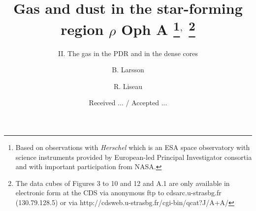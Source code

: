 \documentclass{aa}
\begin{document}
\title{Gas and dust in the star-forming region $\rho$ Oph A
\thanks{Based on observations with {\it Herschel} which is an ESA space observatory with science instruments provided by European-led Principal Investigator consortia and with important participation from NASA.}$^{,}$
\thanks{The data cubes of Figures 3 to 10 and 12 and A.1 are only available in electronic form at the CDS via anonymous ftp to cdsarc.u-strasbg.fr (130.79.128.5) or via http://cdsweb.u-strasbg.fr/cgi-bin/qcat?J/A+A/}
}

\subtitle{II. The gas in the PDR and in the dense cores}

\author{
                B. Larsson                                              
        \and
                R. Liseau  
        }


\date{Received ... / Accepted ...}
%
%
\end{document}
